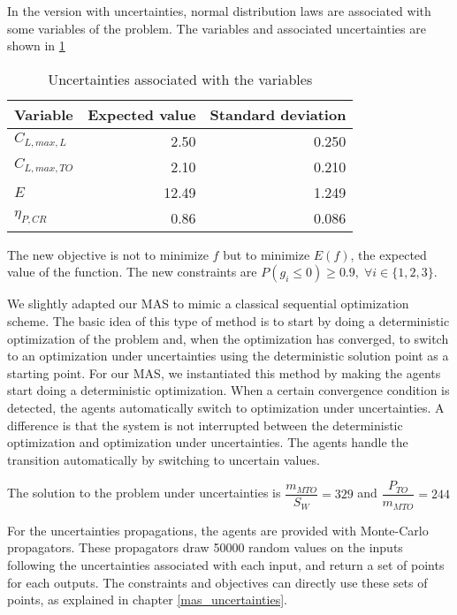 In the version with uncertainties, normal distribution laws are associated with some variables of the problem. The variables and associated uncertainties are shown in \tablename{} \ref{uncertainties_values}

\begin{table}
\caption{Uncertainties associated with the variables}\label{uncertainties_values}
\centering
\begin{tabular}{lrr}
\toprule
Variable & Expected value & Standard deviation\\
\midrule
$C_{L,max,L}$			&	2.50		&	0.250	\\
$C_{L, max, TO}$	&	2.10		&	0.210	\\
$E$								&	12.49	&	1.249	\\
$\eta_{P, CR}$			&	0.86		&	0.086	\\
\bottomrule
\end{tabular}
\end{table}

The new objective is not to minimize $f$ but to minimize $E(f)$, the expected value of the function. The new constraints are $P(g_i \leq 0) \geq 0.9, \; \forall i \in \{1, 2, 3\}$.

We slightly adapted our MAS to mimic a classical sequential optimization scheme. The basic idea of this type of method is to start by doing a deterministic optimization of the problem and, when the optimization has converged, to switch to an optimization under uncertainties using the deterministic solution point as a starting point. For our MAS, we instantiated this method by making the agents start doing a deterministic optimization. When a certain convergence condition is detected, the agents automatically switch to  optimization under uncertainties. A difference is that the system is not interrupted between the deterministic optimization and optimization under uncertainties. The agents handle the transition automatically by switching to uncertain values.

The solution to the problem under uncertainties is $\dfrac{m_{MTO}}{S_W} = 329$ and $\dfrac{P_{TO}}{m_{MTO}} = 244$

For the uncertainties propagations, the agents are provided with Monte-Carlo propagators. These propagators draw 50000 random values on the inputs following the uncertainties associated with each input, and return a set of points for each outputs. The constraints and objectives can directly use these sets of points, as explained in chapter \ref{mas_uncertainties}.


